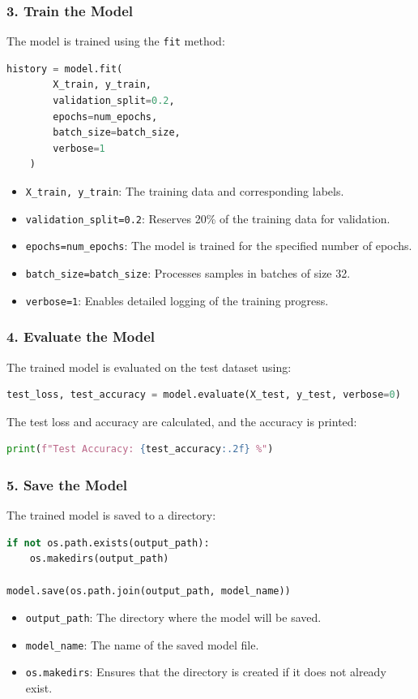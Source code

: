\subsubsection*{3. Train the Model}
The model is trained using the \texttt{fit} method:
\begin{lstlisting}[language=Python]
	history = model.fit(
		X_train, y_train,
		validation_split=0.2,
		epochs=num_epochs,
		batch_size=batch_size,
		verbose=1
	)
\end{lstlisting}
\begin{itemize}
	\item \texttt{X\_train, y\_train}: The training data and corresponding labels.
	\item \texttt{validation\_split=0.2}: Reserves 20\% of the training data for validation.
	\item \texttt{epochs=num\_epochs}: The model is trained for the specified number of epochs.
	\item \texttt{batch\_size=batch\_size}: Processes samples in batches of size 32.
	\item \texttt{verbose=1}: Enables detailed logging of the training progress.
\end{itemize}

\subsubsection*{4. Evaluate the Model}
The trained model is evaluated on the test dataset using:
\begin{lstlisting}[language=Python]
	test_loss, test_accuracy = model.evaluate(X_test, y_test, verbose=0)
\end{lstlisting}
The test loss and accuracy are calculated, and the accuracy is printed:
\begin{lstlisting}[language=Python]
	print(f"Test Accuracy: {test_accuracy:.2f} %")
\end{lstlisting}

\subsubsection*{5. Save the Model}
The trained model is saved to a directory:
\begin{lstlisting}[language=Python]
if not os.path.exists(output_path):
	os.makedirs(output_path) 

model.save(os.path.join(output_path, model_name))
\end{lstlisting}
\begin{itemize}
	\item \texttt{output\_path}: The directory where the model will be saved.
	\item \texttt{model\_name}: The name of the saved model file.
	\item \texttt{os.makedirs}: Ensures that the directory is created if it does not already exist.
\end{itemize}

